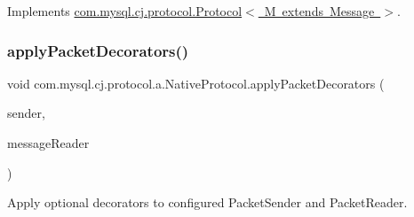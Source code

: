 Implements \mbox{\hyperlink{interfacecom_1_1mysql_1_1cj_1_1protocol_1_1_protocol_ab5abac8e23590e55ada2b133ce963a5c}{com.\+mysql.\+cj.\+protocol.\+Protocol$<$ M extends Message $>$}}.

\mbox{\label{classcom_1_1mysql_1_1cj_1_1protocol_1_1a_1_1_native_protocol_aebf9cad7c22da41d696066a75e768eed}} 
\subsubsection{\texorpdfstring{apply\+Packet\+Decorators()}{applyPacketDecorators()}}
{\footnotesize\ttfamily void com.\+mysql.\+cj.\+protocol.\+a.\+Native\+Protocol.\+apply\+Packet\+Decorators (\begin{DoxyParamCaption}\item[{\mbox{\hyperlink{interfacecom_1_1mysql_1_1cj_1_1protocol_1_1_message_sender}{Message\+Sender}}$<$ \mbox{\hyperlink{classcom_1_1mysql_1_1cj_1_1protocol_1_1a_1_1_native_packet_payload}{Native\+Packet\+Payload}} $>$}]{sender,  }\item[{\mbox{\hyperlink{interfacecom_1_1mysql_1_1cj_1_1protocol_1_1_message_reader}{Message\+Reader}}$<$ \mbox{\hyperlink{classcom_1_1mysql_1_1cj_1_1protocol_1_1a_1_1_native_packet_header}{Native\+Packet\+Header}}, \mbox{\hyperlink{classcom_1_1mysql_1_1cj_1_1protocol_1_1a_1_1_native_packet_payload}{Native\+Packet\+Payload}} $>$}]{message\+Reader }\end{DoxyParamCaption})}

Apply optional decorators to configured Packet\+Sender and Packet\+Reader. \mbox{\label{classcom_1_1mysql_1_1cj_1_1protocol_1_1a_1_1_native_protocol_a30895f4669b803d40bfc8dd8d3f1dd32}} 
